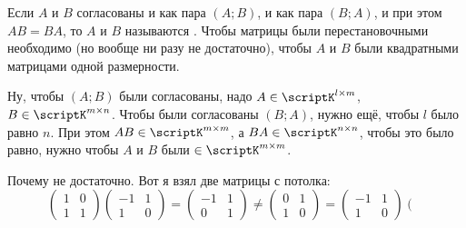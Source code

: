 \documentclass{article}
\begin{document}
\begin{itemize}
\begin{Comment}
\begin{center}
            \end{center}
        \end{Comment}
        \dfn Если $A$ и $B$ согласованы и как пара $(A;B)$, и как пара $(B;A)$, и при этом $AB=BA$, то $A$ и $B$ называются .
        \thm Чтобы матрицы были перестановочными необходимо (но вообще ни разу не достаточно), чтобы $A$ и $B$ были квадратными матрицами одной размерности.
        \begin{Proof}
            Ну, чтобы $(A;B)$ были согласованы, надо $A\in\scriptK^{l\times m}$, $B\in\scriptK^{m\times n}$. Чтобы были согласованы $(B;A)$, нужно ещё, чтобы $l$ было равно $n$. При этом $AB\in\scriptK^{m\times m}$, а $BA\in\scriptK^{n\times n}$, чтобы это было равно, нужно чтобы $A$ и $B$ были $\in\scriptK^{m\times m}$.
        \end{Proof}
        \begin{Example}
            Почему не достаточно. Вот я взял две матрицы с потолка:\\
            $$\left(\begin{matrix}
                1&0\\1&1
            \end{matrix}\right)\left(\begin{matrix}
                -1&1\\1&0
            \end{matrix}\right)=\left(\begin{matrix}
                -1&1\\0&1
            \end{matrix}\right)\neq\left(\begin{matrix}
                0&1\\1&0
            \end{matrix}\right)=\left(\begin{matrix}
                -1&1\\1&0
            \end{matrix}\right)\left(\begin{matrix}

\end{matrix}$$
\end{Example}
\end{itemize}
\end{document}
